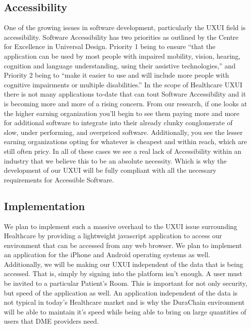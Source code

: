 \documentclass[12pt]{article}
\begin{document}
  \subsection{Accessibility}
  One of the growing issues in software development, particularly the UXUI field is accessibility. Software Accessibility has two priorities as outlined by the Centre for Excellence in Universal Design. Priority 1 being to ensure “that the application can be used by most people with impaired mobility, vision, hearing, cognition and language understanding, using their assistive technologies,” and Priority 2 being to “make it easier to use and will include more people with cognitive impairments or multiple disabilities.” In the scope of Healthcare UXUI there is not many applications to-date that can tout Software Accessibility and it is becoming more and more of a rising concern. From our research, if one looks at the higher earning organization you’ll begin to see them paying more and more for additional software to integrate into their already clunky conglomerate of slow, under performing, and overpriced software. Additionally, you see the lesser earning organizations opting for whatever is cheapest and within reach, which are still often pricy. In all of these cases we see a real lack of Accessibility within an industry that we believe this to be an absolute necessity. Which is why the development of our UXUI will be fully compliant with all the necessary requirements for Accessible Software.

  \subsection{Implementation}
  We plan to implement such a massive overhaul to the UXUI issue surrounding Healthcare by providing a lightweight javascript application to access our environment that can be accessed from any web browser. We plan to implement an application for the iPhone and Android operating systems as well. Additionally, we will be making our UXUI independent of the data that is being accessed. That is, simply by signing into the platform isn’t enough. A user must be invited to a particular Patient’s Room. This is important for not only security, but speed of the application as well. An application independent of the data is not typical in today’s Healthcare market and is why the DuraChain environment will be able to maintain it’s speed while being able to bring on large quantities of users that DME providers need.
\end{document}
